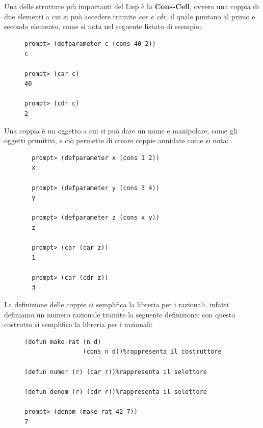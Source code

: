 \documentclass[a4paper]{book}
\begin{document}
Una delle strutture più importanti del Lisp è la \textbf{Cons-Cell}, ovvero una coppia di due elementi a cui si può accedere tramite
\textit{car e cdr}, il quale puntano al primo e secondo elemento, come si nota nel seguente listato di esempio:
\begin{figure}
\begin{verbatim}
prompt> (defparameter c (cons 40 2))
c

prompt> (car c)
40

prompt> (cdr c)
2
\end{verbatim}
\end{figure}
Una coppia è un oggetto a cui si può dare un nome e manipolare, come gli oggetti primitivi, e ciò permette di creare coppie annidate come si nota:
\begin{figure}
\begin{verbatim}
  prompt> (defparameter x (cons 1 2))
  x

  prompt> (defparameter y (cons 3 4))
  y

  prompt> (defparameter z (cons x y))
  z

  prompt> (car (car z))
  1

  prompt> (car (cdr z))
  3
\end{verbatim}
\end{figure}
La definizione delle coppie ci semplifica la libreria per i razionali, infatti definiamo un numero razionale tramite la seguente definizione:
con questo costrutto si semplifica la libreria per i razionali:
\begin{figure}
\begin{verbatim}
(defun make-rat (n d)
                (cons n d))%rappresenta il costruttore

(defun numer (r) (car r))%rappresenta il selettore

(defun denom (r) (cdr r))%rappresenta il selettore

prompt> (denom (make-rat 42 7))
7
\end{verbatim}
\end{figure}
\end{document}
